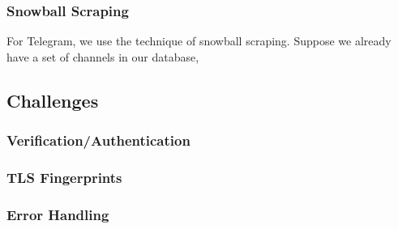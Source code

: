 \documentclass{article}
\begin{document}
	\subsubsection{Snowball Scraping}

	For Telegram, we use the technique of snowball scraping. Suppose we already have a set of channels in our database,


	\subsection{Challenges}

	\subsubsection{Verification/Authentication}

	\subsubsection{TLS Fingerprints}

	\subsubsection{Error Handling}

	\normalem
	
	
\end{document}

